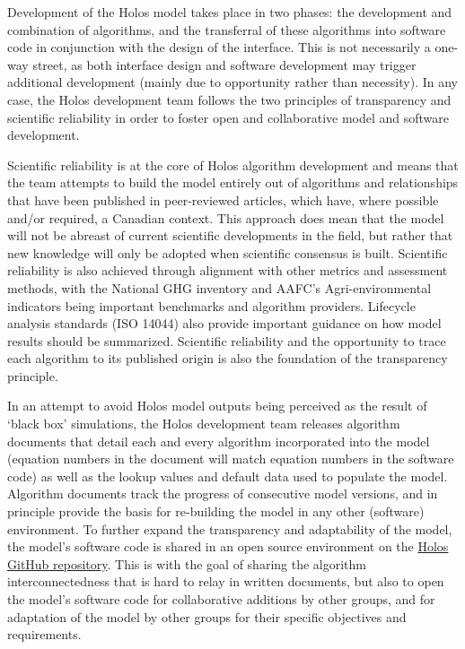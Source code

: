 Development of the Holos model takes place in two phases: the development and
combination of algorithms, and the transferral of these algorithms into software
code in conjunction with the design of the interface. This is not necessarily a
one-way street, as both interface design and software development may trigger
additional development (mainly due to opportunity rather than necessity). In any
case, the Holos development team follows the two principles of transparency and
scientific reliability in order to foster open and collaborative model and
software development.

Scientific reliability is at the core of Holos algorithm development and means
that the team attempts to build the model entirely out of algorithms and
relationships that have been published in peer-reviewed articles, which have,
where possible and/or required, a Canadian context. This approach does mean that
the model will not be abreast of current scientific developments in the field,
but rather that new knowledge will only be adopted when scientific consensus is
built. Scientific reliability is also achieved through alignment with other
metrics and assessment methods, with the National GHG inventory and AAFC's
Agri-environmental indicators being important benchmarks and algorithm
providers. Lifecycle analysis standards (ISO 14044) also provide important
guidance on how model results should be summarized. Scientific reliability and
the opportunity to trace each algorithm to its published origin is also the
foundation of the transparency principle.

In an attempt to avoid Holos model outputs being perceived as the result of
`black box' simulations, the Holos development team releases algorithm documents
that detail each and every algorithm incorporated into the model (equation
numbers in the document will match equation numbers in the software code) as
well as the lookup values and default data used to populate the model. Algorithm
documents track the progress of consecutive model versions, and in principle
provide the basis for re-building the model in any other (software) environment.
To further expand the transparency and adaptability of the model, the model's
software code is shared in an open source environment on the
\href{https://github.com/holos-aafc/Holos}{Holos GitHub repository}. This is
with the goal of sharing the algorithm interconnectedness that is hard to relay
in written documents, but also to open the model's software code for
collaborative additions by other groups, and for adaptation of the model by
other groups for their specific objectives and requirements.

